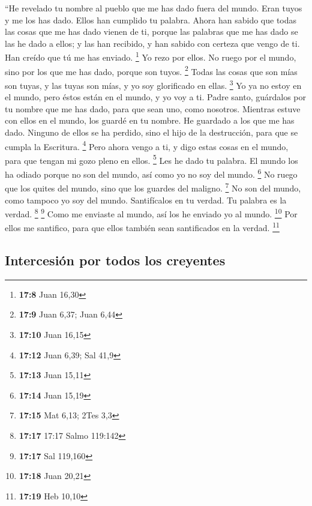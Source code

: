  ``He revelado tu nombre al pueblo que me has dado fuera
del mundo. Eran tuyos y me los has dado. Ellos han cumplido tu palabra.
 Ahora han sabido que todas las cosas que me has dado
vienen de ti,  porque las palabras que me has dado se las
he dado a ellos; y las han recibido, y han sabido con certeza que vengo
de ti. Han creído que tú me has enviado. \footnote{\textbf{17:8} Juan
  16,30}  Yo rezo por ellos. No ruego por el mundo, sino
por los que me has dado, porque son tuyos. \footnote{\textbf{17:9} Juan
  6,37; Juan 6,44}  Todas las cosas que son mías son
tuyas, y las tuyas son mías, y yo soy glorificado en ellas. \footnote{\textbf{17:10}
  Juan 16,15}  Yo ya no estoy en el mundo, pero éstos
están en el mundo, y yo voy a ti. Padre santo, guárdalos por tu nombre
que me has dado, para que sean uno, como nosotros. 
Mientras estuve con ellos en el mundo, los guardé en tu nombre. He
guardado a los que me has dado. Ninguno de ellos se ha perdido, sino el
hijo de la destrucción, para que se cumpla la Escritura. \footnote{\textbf{17:12}
  Juan 6,39; Sal 41,9}  Pero ahora vengo a ti, y digo
estas cosas en el mundo, para que tengan mi gozo pleno en ellos.
\footnote{\textbf{17:13} Juan 15,11}  Les he dado tu
palabra. El mundo los ha odiado porque no son del mundo, así como yo no
soy del mundo. \footnote{\textbf{17:14} Juan 15,19}  No
ruego que los quites del mundo, sino que los guardes del maligno.
\footnote{\textbf{17:15} Mat 6,13; 2Tes 3,3}  No son del
mundo, como tampoco yo soy del mundo.  Santifícalos en tu
verdad. Tu palabra es la verdad. \footnote{\textbf{17:17} 17:17 Salmo
  119:142} \footnote{\textbf{17:17} Sal 119,160}  Como me
enviaste al mundo, así los he enviado yo al mundo. \footnote{\textbf{17:18}
  Juan 20,21}  Por ellos me santifico, para que ellos
también sean santificados en la verdad. \footnote{\textbf{17:19} Heb
  10,10}

\hypertarget{intercesiuxf3n-por-todos-los-creyentes}{%
\subsection{Intercesión por todos los
creyentes}\label{intercesiuxf3n-por-todos-los-creyentes}}

